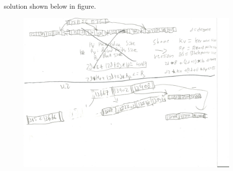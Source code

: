 \documentclass[11pt]{article}
\begin{document}
\begin{enumerate}
	solution shown below in figure.\\
	\begin{figure}
		\centering
		\includegraphics{fourPointTwo.jpeg}
	\end{figure}

	
	
	

\end{enumerate}
\end{document}
